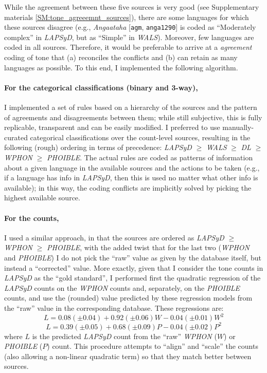 \documentclass[twoside,onecolumn]{article}
\begin{document}
While the agreement between these five sources is very good (see Supplementary materials \ref{SM:tone_agreeemnt_sources}), there are some languages for which these sources disagree (e.g., \textit{Angaataha} [\texttt{agm}, \texttt{anga1290}] is coded as ``Moderately complex'' in \textit{LAPSyD}, but as ``Simple'' in \textit{WALS}).
Moreover, few languages are coded in all sources.
Therefore, it would be preferable to arrive at a \emph{agreement} coding of tone that (a) reconciles the conflicts and (b) can retain as many languages as possible.
To this end, I implemented the following algorithm.

\paragraph{For the categorical classifications (binary and 3-way),}
I implemented a set of rules based on a hierarchy of the sources and the pattern of agreements and disagreements between them; while still subjective, this is fully replicable, transparent and can be easily modified.
I preferred to use manually-curated categorical classifications over the count-level sources, resulting in the following (rough) ordering in terms of precedence: \textit{LAPSyD} $\geq$ \textit{WALS} $\geq$ \textit{DL} $\geq$ \textit{WPHON} $\geq$ \textit{PHOIBLE}.
The actual rules are coded as patterns of information about a given language in the available sources and the actions to be taken (e.g., if a language has info in \textit{LAPSyD}, then this is used no matter what other info is available); in this way, the coding conflicts are implicitly solved by picking the highest available source.

\paragraph{For the counts,}
I used a similar approach, in that the sources are ordered as \textit{LAPSyD} $\geq$ \textit{WPHON} $\geq$ \textit{PHOIBLE}, with the added twist that for the last two (\textit{WPHON} and \textit{PHOIBLE}) I do not pick the ``raw'' value as given by the database itself, but instead a ``corrected'' value.
More exactly, given that I consider the tone counts in \textit{LAPSyD} as the ``gold standard'', I performed first the quadratic regression of the \textit{LAPSyD} counts on the \textit{WPHON} counts and, separately, on the  \textit{PHOIBLE} counts, and use the (rounded) value predicted by these regression models from the ``raw'' value in the corresponding database.
These regressions are:
$$L = 0.08 (\pm0.04) + 0.92 (\pm0.06)W - 0.04 (\pm0.01)W^2$$
$$L = 0.39 (\pm0.05) + 0.68 (\pm0.09)P - 0.04 (\pm0.02)P^2$$
where $L$ is the predicted \textit{LAPSyD} count from the ``raw'' \textit{WPHON} ($W$) or \textit{PHOIBLE} ($P$) count.
This procedure attempts to ``align'' and ``scale'' the counts (also allowing a non-linear quadratic term) so that they match better between sources.
\end{document}
